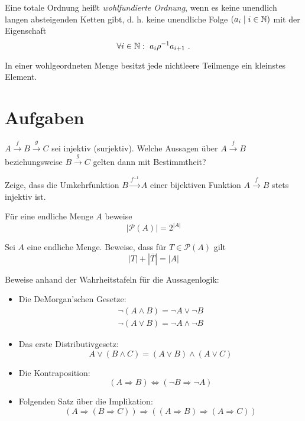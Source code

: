 \begin{definition}
  Eine totale Ordnung heißt \textit{wohlfundierte
    Ordnung}, wenn es keine unendlich langen
  absteigenden Ketten gibt, d. h. keine unendliche Folge $(a_i\mid i\in\mathbb{N})$
  mit der Eigenschaft
  \[\forall i\in\enn:\ a_i\rho^{-1}a_{i+1}\ .\]
\end{definition}
In einer wohlgeordneten Menge besitzt jede
  nichtleere Teilmenge ein kleinstes Element.

\section*{Aufgaben}
\begin{aufgabe}
 $A \stackrel{f}{\rightarrow}B\stackrel{g}{\rightarrow}C$ sei injektiv
   (surjektiv). Welche Aussagen über $A\stackrel{f}{\rightarrow}B$ beziehungsweise 
   $B\stackrel{g}{\rightarrow}C$ gelten dann mit Bestimmtheit?
\end{aufgabe}

\begin{aufgabe} 
   Zeige, dass die Umkehrfunktion $B \stackrel{f^{-1}}{\longrightarrow}
   A$ einer bijektiven Funktion $A \stackrel{f}{\rightarrow} B$ stets
   injektiv ist.
\end{aufgabe}

\begin{aufgabe}
        Für eine endliche Menge $A$ beweise
        \[|\mathcal{P}(A)| = 2^{|A|}\]
\end{aufgabe}

\begin{aufgabe}
        Sei $A$ eine endliche Menge. Beweise, dass für $T\in\mathcal{P}(A)$
        gilt
\[|T| + |\overline T| = |A|\]
\end{aufgabe}

\begin{aufgabe}
  Beweise anhand der Wahrheitstafeln für die Aussagenlogik:
  \begin{itemize}
  \item Die DeMorgan'schen Gesetze:
    \begin{eqnarray*}
      \neg(A\wedge B) = \neg A \vee \neg B\\
      \neg(A\vee B) = \neg A \wedge \neg B
    \end{eqnarray*}
  \item Das erste Distributivgesetz:
    \begin{displaymath}
      A\vee(B\wedge C) = (A\vee B)\wedge (A\vee C)
    \end{displaymath}
  \item Die Kontraposition:
    \begin{displaymath}
      (A\Rightarrow B) \Leftrightarrow (\neg B\Rightarrow \neg A)
    \end{displaymath}
  \item Folgenden Satz über die Implikation:
    \begin{displaymath}
    (A\Rightarrow (B\Rightarrow C))\Rightarrow((A\Rightarrow
      B)\Rightarrow (A\Rightarrow C))
    \end{displaymath}
  \end{itemize}
\end{aufgabe}

